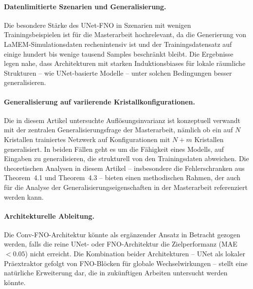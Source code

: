 \documentclass[a4paper,12pt]{article}
\begin{document}
\paragraph{Datenlimitierte Szenarien und Generalisierung.} Die besondere Stärke des UNet-FNO in Szenarien mit wenigen Trainingsbeispielen ist für die Masterarbeit hochrelevant, da die Generierung von LaMEM-Simulationsdaten rechenintensiv ist und der Trainingsdatensatz auf einige hundert bis wenige tausend Samples beschränkt bleibt. Die Ergebnisse legen nahe, dass Architekturen mit starken Induktionsbiases für lokale räumliche Strukturen -- wie UNet-basierte Modelle -- unter solchen Bedingungen besser generalisieren.

\paragraph{Generalisierung auf variierende Kristallkonfigurationen.} Die in diesem Artikel untersuchte Auflösungsinvarianz ist konzeptuell verwandt mit der zentralen Generalisierungsfrage der Masterarbeit, nämlich ob ein auf $N$ Kristallen trainiertes Netzwerk auf Konfigurationen mit $N+m$ Kristallen generalisiert. In beiden Fällen geht es um die Fähigkeit eines Modells, auf Eingaben zu generalisieren, die strukturell von den Trainingsdaten abweichen. Die theoretischen Analysen in diesem Artikel -- insbesondere die Fehlerschranken aus Theorem~4.1 und Theorem~4.3 -- bieten einen methodischen Rahmen, der auch für die Analyse der Generalisierungseigenschaften in der Masterarbeit referenziert werden kann.

\paragraph{Architekturelle Ableitung.} Die Conv-FNO-Architektur könnte als ergänzender Ansatz in Betracht gezogen werden, falls die reine UNet- oder FNO-Architektur die Zielperformanz (MAE $< 0.05$) nicht erreicht. Die Kombination beider Architekturen -- UNet als lokaler Präextraktor gefolgt von FNO-Blöcken für globale Wechselwirkungen -- stellt eine natürliche Erweiterung dar, die in zukünftigen Arbeiten untersucht werden könnte.
\end{document}

